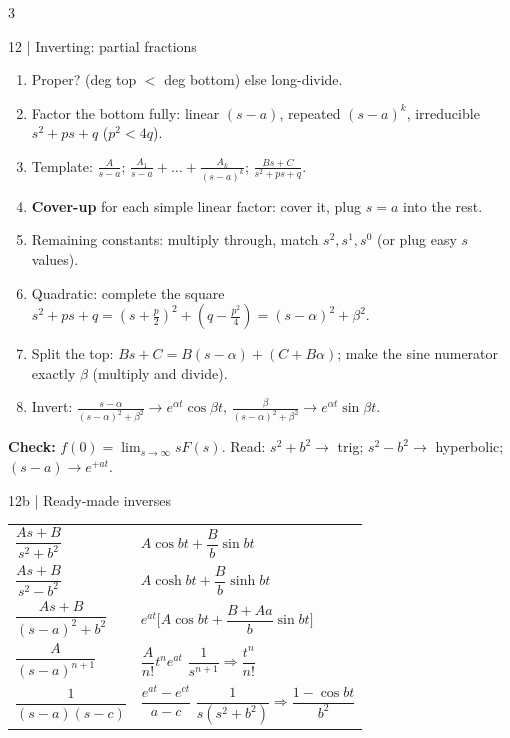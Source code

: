 \documentclass[8pt]{extarticle}
\newcommand{\key}[1]{\textcolor{grn}{\textbf{#1}}}
\newcommand{\chk}[1]{\par\textcolor{grn}{\textbf{Check:}} #1}
\begin{document}
\begin{multicols*}{3}
\begin{card}{12 \;|\; Inverting: partial fractions}
\begin{enumerate}
\item Proper? (deg top $<$ deg bottom) else long-divide.
\item Factor the bottom fully: linear $(s-a)$, repeated $(s-a)^k$, irreducible $s^2+ps+q$ ($p^2<4q$).
\item Template: $\frac{A}{s-a}$; \;$\frac{A_1}{s-a}+\dots+\frac{A_k}{(s-a)^k}$; \;$\frac{Bs+C}{s^2+ps+q}$.
\item \key{Cover-up} for each simple linear factor: cover it, plug $s=a$ into the rest.
\item Remaining constants: multiply through, match $s^2,s^1,s^0$ (or plug easy $s$ values).
\item Quadratic: complete the square $s^2+ps+q=(s+\frac p2)^2+(q-\frac{p^2}4)=(s-\alpha)^2+\beta^2$.
\item Split the top: $Bs+C=B(s-\alpha)+(C+B\alpha)$; make the sine numerator exactly $\beta$ (multiply and divide).
\item Invert: $\frac{s-\alpha}{(s-\alpha)^2+\beta^2}\to e^{\alpha t}\cos\beta t$, \;$\frac{\beta}{(s-\alpha)^2+\beta^2}\to e^{\alpha t}\sin\beta t$.
\end{enumerate}
\chk{$f(0)=\lim_{s\to\infty}sF(s)$. Read: $s^2+b^2\to$ trig; $s^2-b^2\to$ hyperbolic; $(s-a)\to e^{+at}$.}
\end{card}

\begin{card}{12b \;|\; Ready-made inverses}
\renewcommand{\arraystretch}{1.55}
\begin{tabular}{@{}l@{\;$\Rightarrow$\;}l@{}}
$\dfrac{As+B}{s^2+b^2}$ & $A\cos bt+\dfrac Bb\sin bt$\\
$\dfrac{As+B}{s^2-b^2}$ & $A\cosh bt+\dfrac Bb\sinh bt$\\
$\dfrac{As+B}{(s-a)^2+b^2}$ & $e^{at}\Big[A\cos bt+\dfrac{B+Aa}b\sin bt\Big]$\\
$\dfrac{A}{(s-a)^{n+1}}$ & $\dfrac A{n!}t^ne^{at}$ \;\; $\dfrac1{s^{n+1}}\Rightarrow\dfrac{t^n}{n!}$\\
$\dfrac1{(s-a)(s-c)}$ & $\dfrac{e^{at}-e^{ct}}{a-c}$ \;\; $\dfrac1{s(s^2+b^2)}\Rightarrow\dfrac{1-\cos bt}{b^2}$
\end{tabular}
\end{card}


\end{multicols*}
\end{document}
